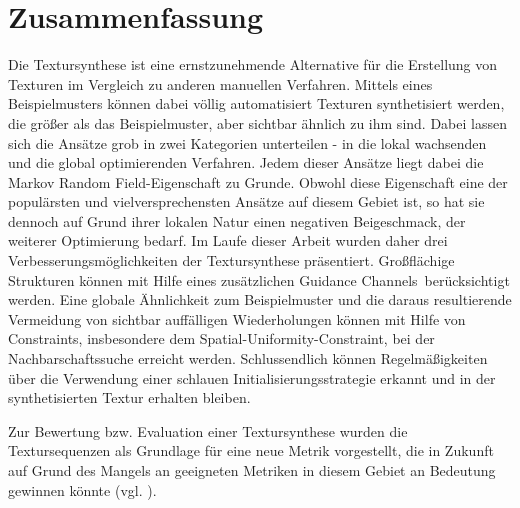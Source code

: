 \section{Zusammenfassung}

Die Textursynthese ist eine ernstzunehmende Alternative für die Erstellung von Texturen im Vergleich zu anderen manuellen Verfahren.
Mittels eines Beispielmusters können dabei völlig automatisiert Texturen synthetisiert werden, die größer als das Beispielmuster, aber sichtbar ähnlich zu ihm sind.
Dabei lassen sich die Ansätze grob in zwei Kategorien unterteilen - in die lokal wachsenden und die global optimierenden Verfahren.
Jedem dieser Ansätze liegt dabei die \glqq Markov Random Field\grqq -Eigenschaft zu Grunde.
Obwohl diese Eigenschaft eine der populärsten und vielversprechensten Ansätze auf diesem Gebiet ist, so hat sie dennoch auf Grund ihrer lokalen Natur einen negativen Beigeschmack, der weiterer Optimierung bedarf.
Im Laufe dieser Arbeit wurden daher drei Verbesserungsmöglichkeiten der Textursynthese präsentiert.
Großflächige Strukturen können mit Hilfe eines zusätzlichen \glqq Guidance Channels\grqq \ berücksichtigt werden.
Eine globale Ähnlichkeit zum Beispielmuster und die daraus resultierende Vermeidung von sichtbar auffälligen Wiederholungen können mit Hilfe von Constraints, insbesondere dem \glqq Spatial-Uniformity\grqq -Constraint, bei der Nachbarschaftssuche erreicht werden.
Schlussendlich können Regelmäßigkeiten über die Verwendung einer schlauen Initialisierungsstrategie erkannt und in der synthetisierten Textur erhalten bleiben.

Zur Bewertung bzw. Evaluation einer Textursynthese wurden die Textursequenzen als Grundlage für eine neue Metrik vorgestellt, die in Zukunft auf Grund des Mangels an geeigneten Metriken in diesem Gebiet an Bedeutung gewinnen könnte (vgl. \cite{SelfTuning}).